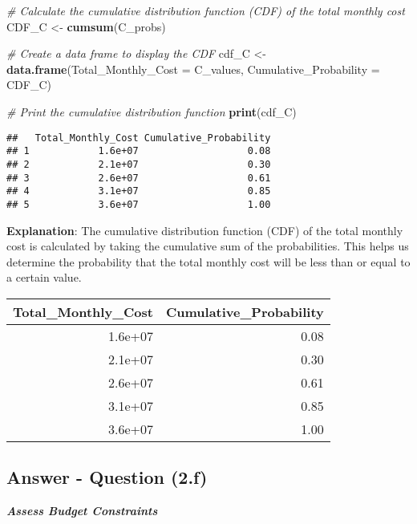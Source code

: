 \documentclass[
  11pt,
]{article}
\newenvironment{Shaded}{\begin{snugshade}}{\end{snugshade}}
\newcommand{\AttributeTok}[1]{\textcolor[rgb]{0.13,0.29,0.53}{#1}}
\newcommand{\CommentTok}[1]{\textcolor[rgb]{0.56,0.35,0.01}{\textit{#1}}}
\newcommand{\FunctionTok}[1]{\textcolor[rgb]{0.13,0.29,0.53}{\textbf{#1}}}
\newcommand{\NormalTok}[1]{#1}
\newcommand{\OtherTok}[1]{\textcolor[rgb]{0.56,0.35,0.01}{#1}}
\begin{document}
\begin{Shaded}
\begin{Highlighting}[]
\CommentTok{\# Calculate the cumulative distribution function (CDF) of the total monthly cost}
\NormalTok{CDF\_C }\OtherTok{\textless{}{-}} \FunctionTok{cumsum}\NormalTok{(C\_probs)}

\CommentTok{\# Create a data frame to display the CDF}
\NormalTok{cdf\_C }\OtherTok{\textless{}{-}} \FunctionTok{data.frame}\NormalTok{(}\AttributeTok{Total\_Monthly\_Cost =}\NormalTok{ C\_values, }\AttributeTok{Cumulative\_Probability =}\NormalTok{ CDF\_C)}

\CommentTok{\# Print the cumulative distribution function}
\FunctionTok{print}\NormalTok{(cdf\_C)}
\end{Highlighting}
\end{Shaded}

\begin{verbatim}
##   Total_Monthly_Cost Cumulative_Probability
## 1            1.6e+07                   0.08
## 2            2.1e+07                   0.30
## 3            2.6e+07                   0.61
## 4            3.1e+07                   0.85
## 5            3.6e+07                   1.00
\end{verbatim}

\textbf{Explanation}: The cumulative distribution function (CDF) of the
total monthly cost is calculated by taking the cumulative sum of the
probabilities. This helps us determine the probability that the total
monthly cost will be less than or equal to a certain value.

\begin{tabular}{r|r}
\hline
Total\_Monthly\_Cost & Cumulative\_Probability\\
\hline
1.6e+07 & 0.08\\
\hline
2.1e+07 & 0.30\\
\hline
2.6e+07 & 0.61\\
\hline
3.1e+07 & 0.85\\
\hline
3.6e+07 & 1.00\\
\hline
\end{tabular}

\subsection{Answer - Question (2.f)}\label{answer---question-2.f}

\textbf{\emph{Assess Budget Constraints}}
\end{document}
